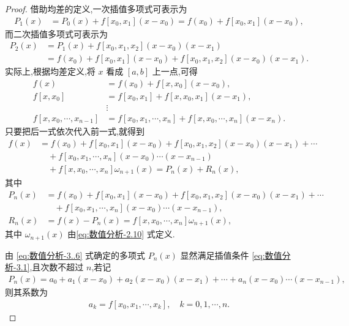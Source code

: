\documentclass[../../main.tex]{subfiles}
\begin{document}
\begin{proof}
借助均差的定义,一次插值多项式可表示为
\begin{align*}
P_1(x) &= P_0(x) + f[x_0, x_1](x - x_0) = f(x_0) + f[x_0, x_1](x - x_0),
\end{align*}
而二次插值多项式可表示为
\begin{align*}
P_2(x) &= P_1(x) + f[x_0, x_1, x_2](x - x_0)(x - x_1) \\
&= f(x_0) + f[x_0, x_1](x - x_0) + f[x_0, x_1, x_2](x - x_0)(x - x_1).
\end{align*}
实际上,根据均差定义,将 $x$ 看成 $[a, b]$ 上一点,可得
\begin{align*}
f(x) &= f(x_0) + f[x, x_0](x - x_0), \\
f[x, x_0] &= f[x_0, x_1] + f[x, x_0, x_1](x - x_1), \\
&\vdots \\
f[x, x_0, \cdots, x_{n-1}] &= f[x_0, x_1, \cdots, x_n] + f[x, x_0, \cdots, x_n](x - x_n).
\end{align*}
只要把后一式依次代入前一式,就得到
\begin{align*}
f(x) &= f(x_0) + f[x_0, x_1](x - x_0) + f[x_0, x_1, x_2](x - x_0)(x - x_1) + \cdots \\
&\quad + f[x_0, x_1, \cdots, x_n](x - x_0) \cdots (x - x_{n-1}) \\
&\quad + f[x, x_0, \cdots, x_n]\omega_{n+1}(x) = P_n(x) + R_n(x),
\end{align*}
其中
\begin{align}
P_n(x) &= f(x_0) + f[x_0, x_1](x - x_0) + f[x_0, x_1, x_2](x - x_0)(x - x_1) + \cdots \nonumber \\
&\quad + f[x_0, x_1, \cdots, x_n](x - x_0) \cdots (x - x_{n-1}),\label{eq:数值分析-3..6} \\
R_n(x) &= f(x) - P_n(x) = f[x, x_0, \cdots, x_n]\omega_{n+1}(x), \nonumber 
\end{align}
其中 $\omega_{n+1}(x)$ 由\eqref{eq:数值分析-2.10} 式定义.

由 \eqref{eq:数值分析-3..6} 式确定的多项式 $P_n(x)$ 显然满足插值条件 \eqref{eq:数值分析-3.1},且次数不超过 $n$,若记
\begin{align*}
P_n(x)=a_0+a_1(x-x_0)+a_2(x-x_0)(x-x_1)+\cdots+a_n(x-x_0)\cdots(x-x_{n-1}),
\end{align*}
则其系数为
\begin{align*}
a_k = f[x_0, x_1, \cdots, x_k], \quad k = 0, 1, \cdots, n.
\end{align*}
\end{proof}
\end{document}

